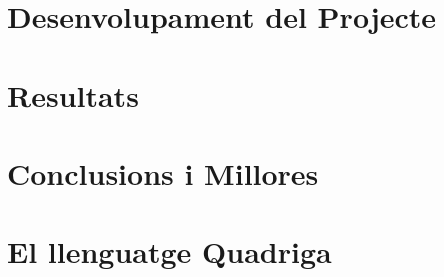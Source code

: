 \documentclass{book}
\begin{document}

\newpage

\newpage


\tableofcontents



\chapter{Desenvolupament del Projecte}

\chapter{Resultats}

\chapter{Conclusions i Millores}

% 



\appendix
\newpage
\chapter{El llenguatge Quadriga}
\end{document}
